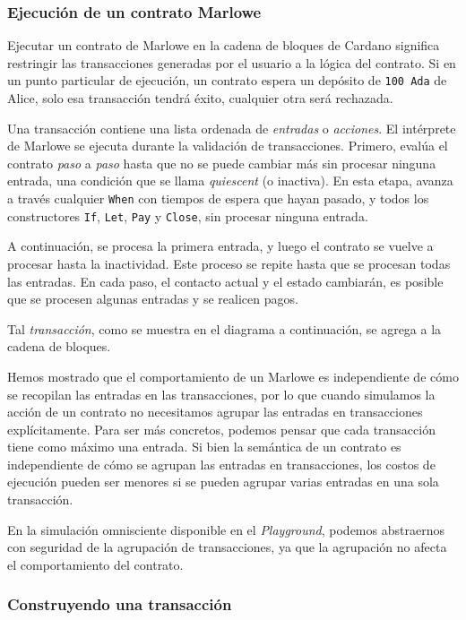 \documentclass[12pt]{book}
\begin{document}
\subsubsection{Ejecución de un contrato Marlowe}
Ejecutar un contrato de Marlowe en la cadena de bloques de Cardano significa restringir las transacciones generadas por el usuario a la lógica del contrato. Si en un punto particular de ejecución, un contrato espera un depósito de \texttt{100 Ada} de Alice, solo esa transacción tendrá éxito, cualquier otra será rechazada.

Una transacción contiene una lista ordenada de \textit{entradas} o \textit{acciones}. El intérprete de Marlowe se ejecuta durante la validación de transacciones. Primero, evalúa el contrato \textit{paso} a \textit{paso} hasta que no se puede cambiar más sin procesar ninguna entrada, una condición que se llama \textit{quiescent} (o inactiva). En esta etapa, avanza a través cualquier \texttt{When} con tiempos de espera que hayan pasado, y todos los constructores \texttt{If}, \texttt{Let}, \texttt{Pay} y \texttt{Close}, sin procesar ninguna entrada.

A continuación, se procesa la primera entrada, y luego el contrato se vuelve a procesar hasta la inactividad. Este proceso se repite hasta que se procesan todas las entradas. En cada paso, el contacto actual y el estado cambiarán, es posible que se procesen algunas entradas y se realicen pagos.

Tal \textit{transacción}, como se muestra en el diagrama a continuación, se agrega a la cadena de bloques. 

Hemos mostrado que el comportamiento de un Marlowe es independiente de cómo se recopilan las entradas en las transacciones, por lo que cuando simulamos la acción de un contrato no necesitamos agrupar las entradas en transacciones explícitamente. Para ser más concretos, podemos pensar que cada transacción tiene como máximo una entrada. Si bien la semántica de un contrato es independiente de cómo se agrupan las entradas en transacciones, los costos de ejecución pueden ser menores si se pueden agrupar varias entradas en una sola transacción.

En la simulación omnisciente disponible en el \textit{Playground}, podemos abstraernos con seguridad de la agrupación de transacciones, ya que la agrupación no afecta el comportamiento del contrato.

\subsubsection{Construyendo una transacción}
\end{document}
